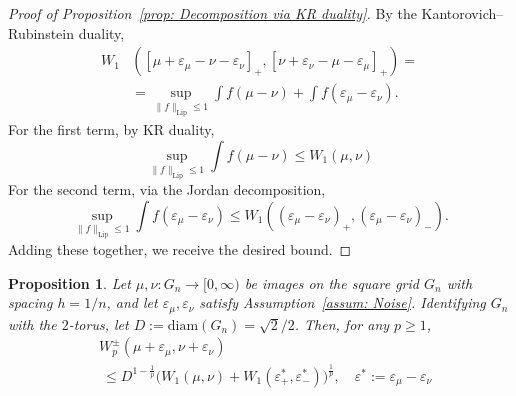 \documentclass{article}
\theoremstyle{plain}
\newtheorem{prop}[thm]{Proposition}
\theoremstyle{definition}
\theoremstyle{remark}
\begin{document}
\begin{proof}[Proof of Proposition~\ref{prop: Decomposition via KR duality}]\label{Proof - prop: Decomposition via KR duality}
By the Kantorovich–Rubinstein duality,
\begin{align}
    W_1 &\left([\mu+\varepsilon_\mu - \nu - \varepsilon_\nu]_+, 
        [\nu+\varepsilon_\nu - \mu - \varepsilon_\mu]_+\right)=
    \\&= \sup_{\|f\|_{\mathrm{Lip}}\le 1}\int f(\mu-\nu) + \int f(\varepsilon_\mu-\varepsilon_\nu). \nonumber
\end{align}
For the first term, by KR duality,
\begin{equation}
    \sup_{\|f\|_{\mathrm{Lip}}\le 1}\int f(\mu-\nu) 
    \le W_1(\mu,\nu)
\end{equation}
For the second term, via the Jordan decomposition,
\begin{equation}
     \sup_{\|f\|_{\mathrm{Lip}}\le 1}\int f(\varepsilon_\mu-\varepsilon_\nu) 
     \le W_1((\varepsilon_\mu-\varepsilon_\nu)_+,(\varepsilon_\mu-\varepsilon_\nu)_-).
\end{equation}
Adding these together, we receive the desired bound.
\end{proof}

\begin{prop}\label{prop: Wp to W1 on noisy images}
Let $\mu,\nu:G_n\to[0,\infty)$ be images on the square grid $G_n$ with spacing $h=1/n$, and let $\varepsilon_\mu,\varepsilon_\nu$ satisfy Assumption~\ref{assum: Noise}. Identifying $G_n$ with the $2$-torus, let $D:=\mathrm{diam}(G_n)=\sqrt{2}/2$. Then, for any $p\ge1$,
\begin{align}\label{eq:two-noisy-main}
&W_p^\pm(\mu+\varepsilon_\mu,\nu+\varepsilon_\nu)
\\&\ \le
D^{1-\frac1p}\big( W_1(\mu,\nu) + W_1(\varepsilon^*_+,\varepsilon^*_-) \big)^{\frac1p}, \quad\varepsilon^*:=\varepsilon_\mu-\varepsilon_\nu \nonumber
\end{align}
\end{prop}
\end{document}
